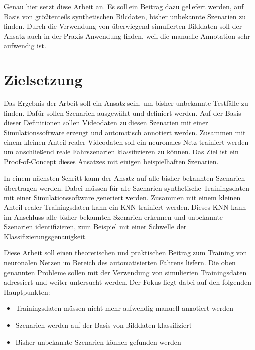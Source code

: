 Genau hier setzt diese Arbeit an. Es soll ein Beitrag dazu geliefert werden, auf Basis von größtenteils synthetischen Bilddaten, bisher unbekannte Szenarien zu finden. Durch die Verwendung von überwiegend simulierten Bilddaten soll der Ansatz auch in der Praxis Anwendung finden, weil die manuelle Annotation sehr aufwendig ist.


\section{Zielsetzung}
\label{einleitung_zielsetzung}

Das Ergebnis der Arbeit soll ein Ansatz sein, um bisher unbekannte Testfälle zu finden. Dafür sollen Szenarien ausgewählt und definiert werden. Auf der Basis dieser Definitionen sollen Videodaten zu diesen Szenarien mit einer Simulationssoftware erzeugt und automatisch annotiert werden. Zusammen mit einem kleinen Anteil realer Videodaten soll ein neuronales Netz trainiert werden um anschließend reale Fahrszenarien klassifizieren zu können. Das Ziel ist ein Proof-of-Concept dieses Ansatzes mit einigen beispielhaften Szenarien.

In einem nächsten Schritt kann der Ansatz auf alle bisher bekannten Szenarien übertragen werden. Dabei müssen für alle Szenarien synthetische Trainingsdaten mit einer Simulationssoftware generiert werden. Zusammen mit einem kleinen Anteil realer Trainingsdaten kann ein \ac{KNN} trainiert werden. Dieses \ac{KNN} kann im Anschluss alle bisher bekannten Szenarien erkennen und unbekannte Szenarien identifizieren, zum Beispiel mit einer Schwelle der Klassifizierungsgenauigkeit.

Diese Arbeit soll einen theoretischen und praktischen Beitrag zum Training von neuronalen Netzen im Bereich des automatisierten Fahrens liefern. Die oben genannten Probleme sollen mit der Verwendung von simulierten Trainingsdaten adressiert und weiter untersucht werden. Der Fokus liegt dabei auf den folgenden Hauptpunkten:

\begin{itemize}
\item Trainingsdaten müssen nicht mehr aufwendig manuell annotiert werden
\item Szenarien werden auf der Basis von Bilddaten klassifiziert
\item Bisher unbekannte Szenarien können gefunden werden
\end{itemize}

